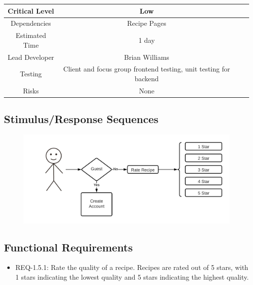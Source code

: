 \documentclass{scrreprt}
\begin{document}
\begin{center}
    \begin{tabular}{| c | c | c | c |}
        \hline
        Critical Level & Low                                                               \\
        \hline
        Dependencies   & Recipe Pages                                                      \\
        \hline
        Estimated Time & 1 day                                                             \\
        \hline
        Lead Developer & Brian Williams                                                    \\
        \hline
        Testing        & Client and focus group frontend testing, unit testing for backend \\
        \hline
        Risks          & None                                                              \\
        \hline
    \end{tabular}
\end{center}

\subsection{Stimulus/Response Sequences}

\begin{figure}[H]\centering
    \includegraphics[width=\columnwidth]{FlowCharts/Recipe-Rating.png}
\end{figure}

\subsection{Functional Requirements}

\begin{itemize}
    \item REQ-1.5.1: Rate the quality of a recipe. Recipes are rated out of 5 stars, with 1 stars indicating the lowest quality and 5 stars indicating the highest quality.
\end{itemize}
\end{document}

